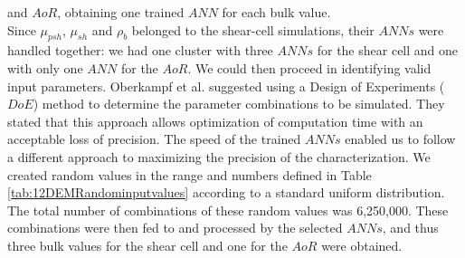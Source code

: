 and $AoR$, obtaining one trained $ANN$ for each bulk value. \\
Since $\mu_{psh}$, $\mu_{sh}$ and $\rho_b$ belonged to the shear-cell
simulations, their $ANNs$ were handled together: we had one cluster with three 
$ANNs$ for the shear cell and one with only one $ANN$ for the $AoR$.
We could then proceed in identifying valid input parameters.
Oberkampf et al. \cite{RefWorks:160} suggested using a Design of Experiments
($DoE$) method to determine the parameter combinations to be simulated.
They stated that this approach allows optimization of computation time
with an acceptable loss of precision.
The speed of the trained $ANNs$ enabled us to follow a different approach to
maximizing the precision of the characterization.
We created random values
in the range and numbers defined in Table \ref{tab:12DEMRandominputvalues}
according to a standard uniform distribution.
The total number of combinations of these random values was 6,250,000.
These combinations were then fed to and processed by the selected
$ANNs$, and thus three bulk values for the shear
cell and one for the $AoR$ were obtained.


